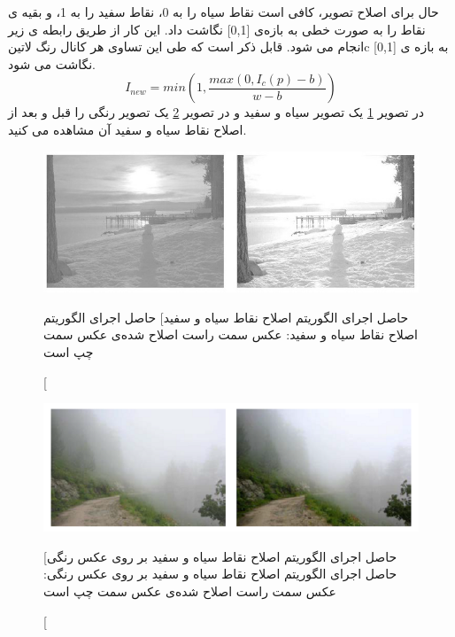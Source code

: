 حال برای اصلاح تصویر، کافی است نقاط سیاه را به 0، نقاط سفید را به 1، و بقیه ی نقاط را به  صورت خطی به  بازه‌ی [0,1]  نگاشت داد. این کار از طریق رابطه ی زیر انجام می شود. قابل ذکر است که طی این تساوی هر کانال رنگ 
‌لاتین{c  }
به بازه ی [0,1] نگاشت می شود.
\begin{equation}
I_{new} = min(1, \frac{max(0, I_{c}(p) - b)}{w - b})
\end{equation}
در تصویر
\ref{fig:bwcorrection}
 یک تصویر سیاه و سفید و در تصویر 
\ref{fig:bwcorrection2}
  یک تصویر رنگی  را قبل و بعد از اصلاح نقاط سیاه و سفید آن مشاهده می کنید.
\begin{figure}[!htb]
 		\includegraphics[width=\linewidth]{images/bwcorrection}
 		\caption
 		[حاصل اجرای الگوریتم اصلاح نقاط سیاه و سفید]
 		{
حاصل اجرای الگوریتم اصلاح نقاط سیاه و سفید: عکس سمت راست اصلاح شده‌ی عکس سمت چپ است
}\label{fig:bwcorrection}
 		\endminipage\hfill
 		
\end{figure}
 \begin{figure}[!tb]
 		\includegraphics[width=\linewidth]{images/bwcorrection2}
 	\caption
 	[حاصل اجرای الگوریتم اصلاح نقاط سیاه و سفید بر روی عکس رنگی]
{حاصل اجرای الگوریتم اصلاح نقاط سیاه و سفید بر روی عکس رنگی: عکس سمت راست اصلاح شده‌ی عکس سمت چپ است}
 	\label{fig:bwcorrection2}
 	\endminipage\hfill
 \end{figure}